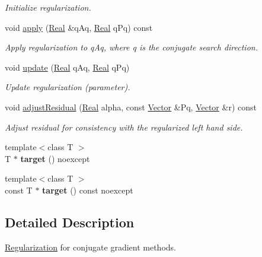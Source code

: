 \begin{DoxyCompactItemize}
\begin{DoxyCompactList}\small\item\em Initialize regularization. \end{DoxyCompactList}\item 
void \hyperlink{classSpacy_1_1CG_1_1Regularization_ab55da1e68e5f25b89aa3713b95d254bd}{apply} (\hyperlink{classSpacy_1_1Real}{Real} \&q\-Aq, \hyperlink{classSpacy_1_1Real}{Real} q\-Pq) const 
\begin{DoxyCompactList}\small\item\em Apply regularization to q\-Aq, where q is the conjugate search direction. \end{DoxyCompactList}\item 
void \hyperlink{classSpacy_1_1CG_1_1Regularization_ae529ec998f6902bb88aea81461f72e65}{update} (\hyperlink{classSpacy_1_1Real}{Real} q\-Aq, \hyperlink{classSpacy_1_1Real}{Real} q\-Pq)
\begin{DoxyCompactList}\small\item\em Update regularization (parameter). \end{DoxyCompactList}\item 
void \hyperlink{classSpacy_1_1CG_1_1Regularization_a1e7aef0bb066f3e07022141de223b606}{adjust\-Residual} (\hyperlink{classSpacy_1_1Real}{Real} alpha, const \hyperlink{classSpacy_1_1Vector}{Vector} \&Pq, \hyperlink{classSpacy_1_1Vector}{Vector} \&r) const 
\begin{DoxyCompactList}\small\item\em Adjust residual for consistency with the regularized left hand side. \end{DoxyCompactList}\item 
\hypertarget{classSpacy_1_1CG_1_1Regularization_aa1cf9cd090c192b0cd4707f986847f93}{{\footnotesize template$<$class T $>$ }\\T $\ast$ {\bfseries target} () noexcept}\label{classSpacy_1_1CG_1_1Regularization_aa1cf9cd090c192b0cd4707f986847f93}

\item 
\hypertarget{classSpacy_1_1CG_1_1Regularization_a131db28e9b9dad012b99860582c5bbf0}{{\footnotesize template$<$class T $>$ }\\const T $\ast$ {\bfseries target} () const noexcept}\label{classSpacy_1_1CG_1_1Regularization_a131db28e9b9dad012b99860582c5bbf0}

\end{DoxyCompactItemize}


\subsection{Detailed Description}
\hyperlink{classSpacy_1_1CG_1_1Regularization}{Regularization} for conjugate gradient methods. 

